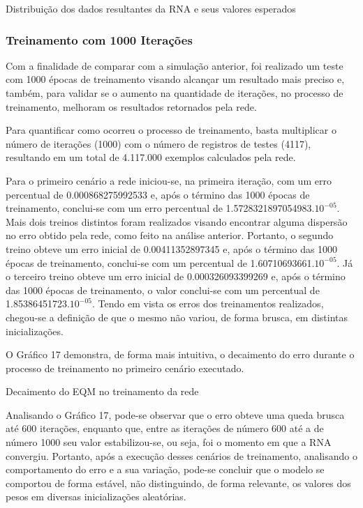 \begin{grafico}[h]
	\centering
	\caption{Distribuição dos dados resultantes da RNA e seus valores esperados}
	\label{lingua}
\end{grafico}

\subsubsection{Treinamento com 1000 Iterações}	
Com a finalidade de comparar com a simulação anterior, foi realizado um teste com 1000 épocas de treinamento visando alcançar um resultado mais preciso e, também, para validar se o aumento na quantidade de iterações, no processo de treinamento, melhoram os resultados retornados pela rede.

Para quantificar como ocorreu o processo de treinamento, basta multiplicar o número de iterações (1000) com o número de registros de testes (4117), resultando em um total de 4.117.000 exemplos calculados pela rede.

Para o primeiro cenário a rede iniciou-se, na primeira iteração, com um erro percentual de 0.000868275992533 e, após o término das 1000 épocas de treinamento, conclui-se com um erro percentual de 1.5728321897054983.$10^{-05}$. Mais dois treinos distintos foram realizados visando encontrar alguma dispersão no erro obtido pela rede, como feito na análise anterior. Portanto, o segundo treino obteve um erro inicial de 0.00411352897345 e, após o término das 1000 épocas de treinamento, conclui-se com um percentual de 1.60710693661.$10^{-05}$. Já o terceiro treino obteve um erro inicial de 0.000326093399269 e, após o término das 1000 épocas de treinamento, o valor conclui-se com um percentual de 1.85386451723.$10^{-05}$. Tendo em vista os erros dos treinamentos realizados, chegou-se a definição de que o mesmo não variou, de forma brusca, em distintas inicializações.

O Gráfico 17 demonstra, de forma mais intuitiva, o decaimento do erro durante o processo de treinamento no primeiro cenário executado.

\begin{grafico}[h]
	\centering
	\caption{Decaimento do EQM no treinamento da rede}
	\label{lingua}
\end{grafico}

Analisando o Gráfico 17, pode-se observar que o erro obteve uma queda brusca até 600 iterações, enquanto que, entre as iterações de número 600 até a de número 1000 seu valor estabilizou-se, ou seja, foi o momento em que a RNA convergiu. Portanto, após a execução desses cenários de treinamento, analisando o comportamento do erro e a sua variação, pode-se concluir que o modelo se comportou de forma estável, não distinguindo, de forma relevante, os valores dos pesos em diversas inicializações aleatórias.

